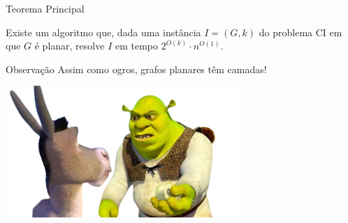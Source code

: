 \begin{frame}{Teorema Principal}
    \begin{thm}
        \label{teo:2}
        Existe um algoritmo que, dada uma instância $I=(G, k)$ do problema CI em que $G$ é planar, resolve $I$ em tempo $2^{O(k)} \cdot n^{O(1)}$.
    \end{thm}
\end{frame}

\begin{frame}{Observação}
    \centering
    \vspace{1cm}
    \pause
    \Large Assim como ogros, grafos planares têm camadas!
    \begin{minipage}{\linewidth}
        \centering
        \vspace{1.73cm}
        \includegraphics[height=5cm]{images/shrek.png}
    \end{minipage}
\end{frame}

